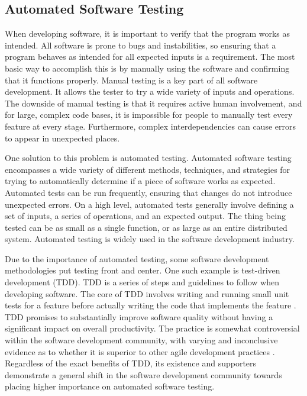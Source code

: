\documentclass{article}
\begin{document}
\begin{onehalfspacing}
\subsection{Automated Software Testing}

When developing software, it is important to verify that the program
works as intended. All software is prone to bugs and instabilities, so
ensuring that a program behaves as intended for all expected inputs is a
requirement. The most basic way to accomplish this is by manually using
the software and confirming that it functions properly. Manual testing
is a key part of all software development. It allows the tester to try a
wide variety of inputs and operations. The downside of manual testing is
that it requires active human involvement, and for large, complex code
bases, it is impossible for people to manually test every feature at
every stage. Furthermore, complex interdependencies can cause errors to
appear in unexpected places.

One solution to this problem is automated testing. Automated software
testing encompasses a wide variety of different methods, techniques, and
strategies for trying to automatically determine if a piece of software
works as expected. Automated tests can be run frequently, ensuring that
changes do not introduce unexpected errors. On a high level, automated
tests generally involve defining a set of inputs, a series of
operations, and an expected output. The thing being tested can be as
small as a single function, or as large as an entire distributed system.
Automated testing is widely used in the software development industry.

Due to the importance of automated testing, some software development
methodologies put testing front and center. One such example is
test-driven development (TDD). TDD is a series of steps and guidelines
to follow when developing software. The core of TDD involves writing and
running small unit tests for a feature before actually writing the code
that implements the feature \parencite{bhat2006evaluating}. 
TDD promises to substantially improve software quality without having a significant impact on overall productivity. The practice is somewhat controversial within the software development community, with varying and inconclusive
evidence as to whether it is superior to other agile development practices \parencite{karac2018we}. 
Regardless of the exact benefits of TDD, its existence and supporters demonstrate a general shift in the software development community towards placing higher importance on automated software testing.


\end{onehalfspacing}
\end{document}
